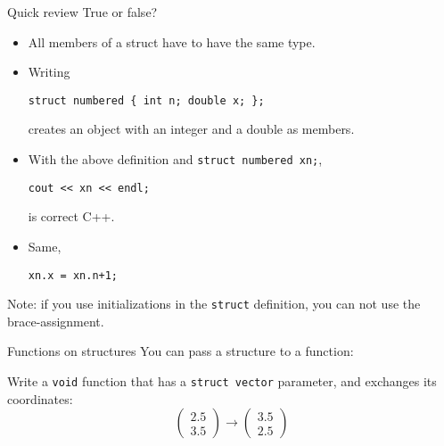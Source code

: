 \begin{exercise}{Quick review}
  \label{rev:func-def}
  True or false?
  \begin{itemize}
  \item All members of a struct have to have the same type.
  \item Writing
\begin{lstlisting}
struct numbered { int n; double x; };
\end{lstlisting}
creates an object with an integer and a double as members.
\item With the above definition and \lstinline$struct numbered xn;$,
\begin{lstlisting}
cout << xn << endl;
\end{lstlisting}
is correct C++.
\item Same, 
\begin{lstlisting}
xn.x = xn.n+1;
\end{lstlisting}
  \end{itemize}
\end{exercise}

Note: if you use initializations in the \lstinline$struct$ definition,
you can not use the brace-assignment.

\begin{block}{Functions on structures}
  \label{sl:struct-pass}
  You can pass a structure to a function:
\end{block}


\begin{exercise}
  \label{ex:vecstruct-flip}
  Write a \lstinline$void$ function that has a \lstinline$struct vector$ parameter,
  and exchanges its coordinates:
  \[ \begin{pmatrix}2.5\\3.5\end{pmatrix} \rightarrow
    \begin{pmatrix}3.5\\2.5\end{pmatrix} \]
\end{exercise}

